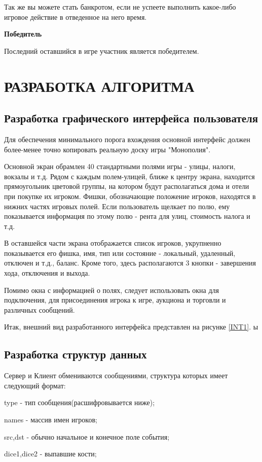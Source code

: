 Так же вы можете стать банкротом, если не успеете выполнить какое-либо игровое действие в отведенное на него время.

{\bf Победитель}

Последний оставшийся в игре участник является победителем.
\section{РАЗРАБОТКА АЛГОРИТМА}
\subsection{Разработка графического интерфейса пользователя}
Для обеспечения минимального порога вхождения основной интерфейс должен более-менее точно копировать реальную доску игры "Монополия".

Основной экран обрамлен 40 стандартными полями игры - улицы, налоги, вокзалы и т.д. Рядом с каждым полем-улицей, ближе к центру экрана, находится прямоугольник цветовой группы, на котором будут располагаться дома и отели при покупке их игроком. Фишки, обозначающие положение игроков, находятся в нижних частях игровых полей. Если пользователь щелкает по полю, ему показывается информация по этому полю - рента для улиц, стоимость налога и т.д.

В оставшейся части экрана отображается список игроков, укрупненно показывается его фишка, имя, тип или состояние - локальный, удаленный, отключен и т.д., баланс. Кроме того, здесь располагаются 3 кнопки - завершения хода, отключения и выхода.

Помимо окна с информацией о полях, следует использовать окна для подключения, для присоединения игрока к игре, аукциона и торговли и различных сообщений.

Итак, внешний вид разработанного интерфейса представлен на рисунке \ref{INT1}.
ы
\subsection{Разработка структур данных}
Сервер и Клиент обмениваются сообщениями, структура которых имеет следующий формат:
        
        type - тип сообщения(расшифровывается ниже);
        
        names - массив имен игроков;
        
        src,dst - обычно начальное и конечное поле события;
        
        dice1,dice2 - выпавшие кости;
        
